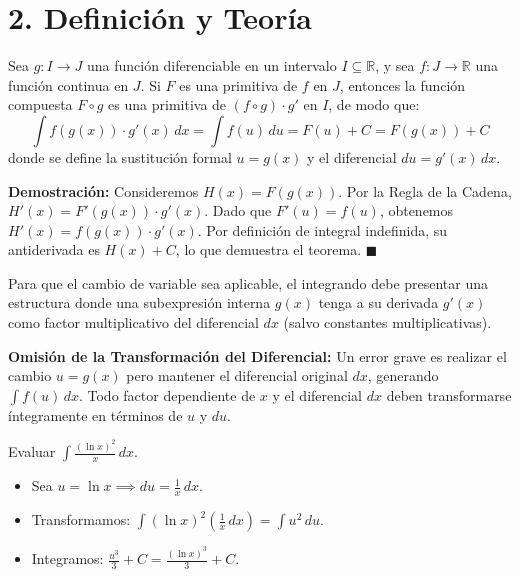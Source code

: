 \documentclass[11pt]{article}
\newenvironment{teoria}{\section*{2. Definición y Teoría}}{}
\newenvironment{definicion}[1]{\begin{tcolorbox}[colback=blue!5,colframe=blue!75!black,title=Definición: #1]}{\end{tcolorbox}}
\newenvironment{teorema}[1]{\begin{tcolorbox}[colback=green!5,colframe=green!75!black,title=Teorema: #1]}{\end{tcolorbox}}
\newenvironment{procesamiento}[1]{\begin{tcolorbox}[colback=gray!10,colframe=gray!75!black,title=Procedimiento / Trampa: #1]}{\end{tcolorbox}}
\newenvironment{ejemplo}[1]{\begin{tcolorbox}[colback=gray!5,colframe=gray!60!black,title=Ejemplo Analítico: #1]}{\end{tcolorbox}}
\begin{document}
\begin{teoria}

  \begin{teorema}{Teorema del Cambio de Variable (Sustitución)}
    Sea $g: I \to J$ una función diferenciable en un intervalo $I \subseteq \mathbb{R}$, y sea $f: J \to \mathbb{R}$ una función continua en $J$. Si $F$ es una primitiva de $f$ en $J$, entonces la función compuesta $F \circ g$ es una primitiva de $(f \circ g) \cdot g'$ en $I$, de modo que:
    \[ \displaystyle\int f(g(x)) \cdot g'(x) \, dx = \displaystyle\int f(u) \, du = F(u) + C = F(g(x)) + C \]
    donde se define la sustitución formal $u = g(x)$ y el diferencial $du = g'(x) \, dx$.
  \end{teorema}

  \textbf{Demostración:} Consideremos $H(x) = F(g(x))$. Por la Regla de la Cadena, $H'(x) = F'(g(x)) \cdot g'(x)$. Dado que $F'(u) = f(u)$, obtenemos $H'(x) = f(g(x)) \cdot g'(x)$. Por definición de integral indefinida, su antiderivada es $H(x) + C$, lo que demuestra el teorema. $\blacksquare$

  \begin{definicion}{Reconocimiento de la Estructura $f(g(x)) \cdot g'(x)$}
    Para que el cambio de variable sea aplicable, el integrando debe presentar una estructura donde una subexpresión interna $g(x)$ tenga a su derivada $g'(x)$ como factor multiplicativo del diferencial $dx$ (salvo constantes multiplicativas).
  \end{definicion}

  \begin{procesamiento}{Incompatibilidad Diferencial}
    \textbf{Omisión de la Transformación del Diferencial:} Un error grave es realizar el cambio $u = g(x)$ pero mantener el diferencial original $dx$, generando $\displaystyle\int f(u) \, dx$. Todo factor dependiente de $x$ y el diferencial $dx$ deben transformarse íntegramente en términos de $u$ y $du$.
  \end{procesamiento}

  \begin{ejemplo}{Reconocimiento Directo del Diferencial (Sustitución)}
    Evaluar $\displaystyle\int \frac{(\ln x)^2}{x} \, dx$.
    \begin{itemize}
      \item Sea $\displaystyle u = \ln x \implies du = \frac{1}{x} \, dx$.
      \item Transformamos: $\displaystyle\int (\ln x)^2 \left( \frac{1}{x} \, dx \right) = \displaystyle\int u^2 \, du$.
      \item Integramos: $\displaystyle \frac{u^3}{3} + C = \frac{(\ln x)^3}{3} + C$.
    \end{itemize}
  \end{ejemplo}


\end{teoria}
\end{document}
